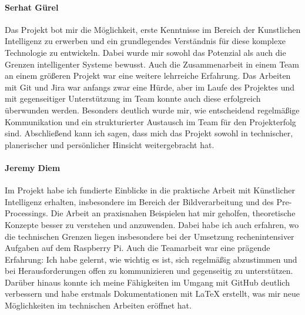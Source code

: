 \paragraph{Serhat Gürel}
Das Projekt bot mir die Möglichkeit, erste Kenntnisse im Bereich der Kunstlichen Intelligenz zu erwerben und ein grundlegendes Verständnis für diese komplexe Technologie zu entwickeln. Dabei wurde mir sowohl das Potenzial als auch die Grenzen intelligenter Systeme bewusst. Auch die Zusammenarbeit in einem Team an einem größeren Projekt war eine weitere lehrreiche Erfahrung. Das Arbeiten mit Git und Jira war anfangs zwar eine Hürde, aber im Laufe des Projektes und mit gegenseitiger Unterstützung im Team konnte auch diese erfolgreich überwunden werden. Besonders deutlich wurde mir, wie entscheidend regelmäßige Kommunikation und ein strukturierter Austausch im Team für den Projekterfolg sind. Abschließend kann ich sagen, dass mich das Projekt sowohl in technischer, planerischer und persönlicher Hinsicht weitergebracht hat.

\paragraph{Jeremy Diem}
Im Projekt habe ich fundierte Einblicke in die praktische Arbeit mit Künstlicher Intelligenz erhalten, insbesondere im Bereich der Bildverarbeitung und des Pre-Processings. Die Arbeit an praxisnahen Beispielen hat mir geholfen, theoretische Konzepte besser zu verstehen und anzuwenden. Dabei habe ich auch erfahren, wo die technischen Grenzen liegen insbesondere bei der Umsetzung rechenintensiver Aufgaben auf dem Raspberry Pi. Auch die Teamarbeit war eine prägende Erfahrung: Ich habe gelernt, wie wichtig es ist, sich regelmäßig abzustimmen und bei Herausforderungen offen zu kommunizieren und gegenseitig zu unterstützen. Darüber hinaus konnte ich meine Fähigkeiten im Umgang mit GitHub deutlich verbessern und habe erstmals Dokumentationen mit LaTeX erstellt, was mir neue Möglichkeiten im technischen Arbeiten eröffnet hat. 